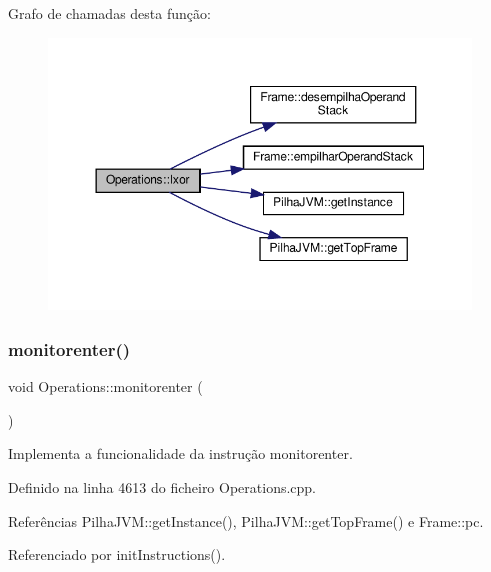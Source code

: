 Grafo de chamadas desta função\+:\nopagebreak
\begin{figure}[H]
\begin{center}
\leavevmode
\includegraphics[width=350pt]{classOperations_ac135e723f1ac6a27c736e6b8e7d06a45_cgraph}
\end{center}
\end{figure}
\mbox{\label{classOperations_a4d62d66d9e60667ed4e689cd6a44ecaa}} 
\subsubsection{\texorpdfstring{monitorenter()}{monitorenter()}}
{\footnotesize\ttfamily void Operations\+::monitorenter (\begin{DoxyParamCaption}{ }\end{DoxyParamCaption})\hspace{0.3cm}{\ttfamily [private]}}



Implementa a funcionalidade da instrução monitorenter. 



Definido na linha 4613 do ficheiro Operations.\+cpp.



Referências Pilha\+J\+V\+M\+::get\+Instance(), Pilha\+J\+V\+M\+::get\+Top\+Frame() e Frame\+::pc.



Referenciado por init\+Instructions().

